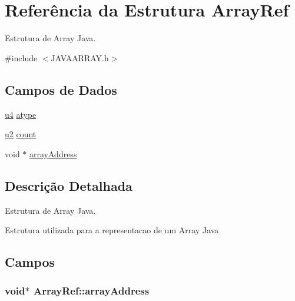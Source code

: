 \hypertarget{struct_array_ref}{}\section{Referência da Estrutura Array\+Ref}
\label{struct_array_ref}


Estrutura de Array Java.  




{\ttfamily \#include $<$J\+A\+V\+A\+A\+R\+R\+A\+Y.\+h$>$}

\subsection*{Campos de Dados}
\begin{DoxyCompactItemize}
\item 
\hyperlink{_e___j_v_m_8h_aedf6ddc03df8caaaccbb4c60b9a9b850}{u4} \hyperlink{struct_array_ref_a0517c4d135daa6329b39ea01e5c498d2}{atype}
\item 
\hyperlink{_e___j_v_m_8h_a5f223212eef04d10a4550ded680cb1cf}{u2} \hyperlink{struct_array_ref_abaaae2def8584a14b087e76d4308aec7}{count}
\item 
void $\ast$ \hyperlink{struct_array_ref_ae8d35b12d681e4e2a69f5f81358c0ec8}{array\+Address}
\end{DoxyCompactItemize}


\subsection{Descrição Detalhada}
Estrutura de Array Java. 

Estrutura utilizada para a representacao de um Array Java 

\subsection{Campos}
\hypertarget{struct_array_ref_ae8d35b12d681e4e2a69f5f81358c0ec8}{}
\subsubsection[{array\+Address}]{\setlength{\rightskip}{0pt plus 5cm}void$\ast$ Array\+Ref\+::array\+Address}\label{struct_array_ref_ae8d35b12d681e4e2a69f5f81358c0ec8}
\hypertarget{struct_array_ref_a0517c4d135daa6329b39ea01e5c498d2}{}
